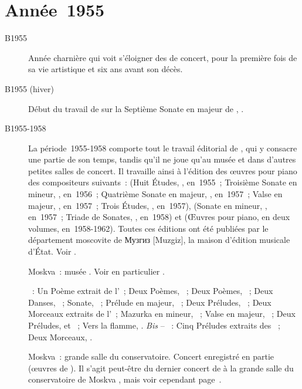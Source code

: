 \section{Année~1955}

\begin{description}
 \item[B1955]\label{bio:1955}
 Année charnière qui voit \Sofronitsky{} s'éloigner des  de concert, pour la première fois de sa vie artistique et six ans
 avant son décès.
 \item[B1955 (hiver)]
 Début du travail de \VSofronitsky{} sur la Septième Sonate en \kB \Flat
 majeur de \SProkofiev{},  \citep[voir][p.~388-394]{Shiryaeva}.
 \item[B1955-1958]
 La période~1955-1958 comporte tout le travail éditorial de \VSofronitsky{},
 qui y consacre une partie de son temps, tandis qu'il ne joue qu'au musée
 \Scriabine{} et dans d'autres petites salles de concert.
 Il travaille ainsi à l'édition des œuvres pour piano des compositeurs
 suivants~: \AScriabine{} (Huit Études, , en~1955~; Troisième
 Sonate en \kF \Sharp mineur, , en~1956~; Quatrième Sonate en \kF
 \Sharp majeur, , en~1957~; Valse en \kA \Flat majeur, ,
 en~1957~; Trois Études, , en~1957), \NMedtner{} (Sonate en \kG
 mineur, , en~1957~; Triade de Sonates, , en~1958) et
 \MRavel{} (Œuvres pour piano, en deux volumes, en~1958-1962).
 Toutes ces éditions ont été publiées par le département moscovite de
 \foreignlanguage{russian}{Музгиз} [Muzgiz], la maison d'édition musicale
 d'\hbox{État}.
 Voir \citet[p.~126 et note en bas de page]{Nikonovich08a}.
 \item[]
 Moskva~: musée \Scriabine{}.
 Voir en particulier \citet[p.~448]{Milshteyn82a}.

 \textsc{\Scriabine{}}~: Un Poème extrait de l'~; Deux Poèmes,
 ~; Deux Poèmes, ~; Deux Danses, ~; Sonate,
 ~; Prélude en \kE majeur,  ~; Deux Préludes,
 ~; Deux Morceaux extraits de l'~; Mazurka en \kE mineur,
  ~; Valse en \kA \Flat majeur, ~; Deux
 Préludes,   et  ~; Vers la flamme,
 .
 \emph{Bis} -- \textsc{\Scriabine{}}~: Cinq Préludes extraits des ~; Deux Morceaux, .
 \item[]
 Moskva~: grande salle du conservatoire.
 Concert enregistré en partie (œuvres de \Scriabine{}).
 Il s'agit peut-être du dernier concert de \VSofronitsky{} à la grande salle
 du conservatoire de Moskva \citep[voir][p.~14]{White}, mais voir cependant
 page~\pageref{bio:LateMCGH}.


\end{description}
